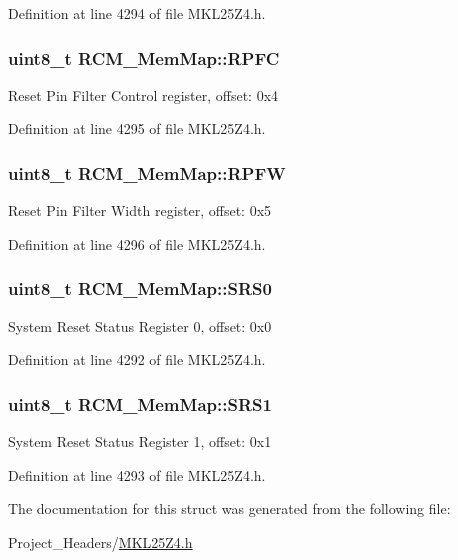 Definition at line 4294 of file M\+K\+L25\+Z4.\+h.

\subsubsection[{\texorpdfstring{R\+P\+FC}{RPFC}}]{\setlength{\rightskip}{0pt plus 5cm}uint8\+\_\+t R\+C\+M\+\_\+\+Mem\+Map\+::\+R\+P\+FC}\hypertarget{struct_r_c_m___mem_map_ace89c039f8342f8b5dd26c3c7b8309a2}{}\label{struct_r_c_m___mem_map_ace89c039f8342f8b5dd26c3c7b8309a2}
Reset Pin Filter Control register, offset\+: 0x4 

Definition at line 4295 of file M\+K\+L25\+Z4.\+h.

\subsubsection[{\texorpdfstring{R\+P\+FW}{RPFW}}]{\setlength{\rightskip}{0pt plus 5cm}uint8\+\_\+t R\+C\+M\+\_\+\+Mem\+Map\+::\+R\+P\+FW}\hypertarget{struct_r_c_m___mem_map_ac458f95f6aa234285f568694a5b8240d}{}\label{struct_r_c_m___mem_map_ac458f95f6aa234285f568694a5b8240d}
Reset Pin Filter Width register, offset\+: 0x5 

Definition at line 4296 of file M\+K\+L25\+Z4.\+h.

\subsubsection[{\texorpdfstring{S\+R\+S0}{SRS0}}]{\setlength{\rightskip}{0pt plus 5cm}uint8\+\_\+t R\+C\+M\+\_\+\+Mem\+Map\+::\+S\+R\+S0}\hypertarget{struct_r_c_m___mem_map_aa28b91bdb2e1acc454f7bcb9ad26efb7}{}\label{struct_r_c_m___mem_map_aa28b91bdb2e1acc454f7bcb9ad26efb7}
System Reset Status Register 0, offset\+: 0x0 

Definition at line 4292 of file M\+K\+L25\+Z4.\+h.

\subsubsection[{\texorpdfstring{S\+R\+S1}{SRS1}}]{\setlength{\rightskip}{0pt plus 5cm}uint8\+\_\+t R\+C\+M\+\_\+\+Mem\+Map\+::\+S\+R\+S1}\hypertarget{struct_r_c_m___mem_map_a8e7926e6f51e64e63e5ed3adb7aee612}{}\label{struct_r_c_m___mem_map_a8e7926e6f51e64e63e5ed3adb7aee612}
System Reset Status Register 1, offset\+: 0x1 

Definition at line 4293 of file M\+K\+L25\+Z4.\+h.



The documentation for this struct was generated from the following file\+:\begin{DoxyCompactItemize}
\item 
Project\+\_\+\+Headers/\hyperlink{_m_k_l25_z4_8h}{M\+K\+L25\+Z4.\+h}\end{DoxyCompactItemize}
